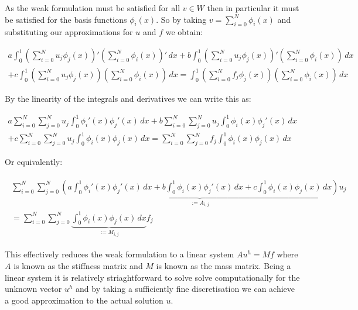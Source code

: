 As the weak formulation  must be satisfied for
all $v \in W$ then in particular it must be satisfied for the basis functions
$\phi_i(x)$. So by taking $v = \sum_{i = 0}^N\phi_i(x)$ and substituting our
approximations for $u$ and $f$ we obtain:

\begin{align*}
    a\int_0^1{\left(\sum_{i = 0}^N{u_j\phi_j(x)}\right)'\left(\sum_{i = 0}^N\phi_i(x)\right)'\, dx}
    +b\int_0^1{\left(\sum_{i = 0}^N{u_j\phi_j(x)}\right)'\left(\sum_{i = 0}^N\phi_i(x)\right)\, dx} \\
    +c\int_0^1{\left(\sum_{i = 0}^N{u_j\phi_j(x)}\right)\left(\sum_{i = 0}^N\phi_i(x)\right)\, dx} =
    \int_0^1{\left(\sum_{i = 0}^Nf_j\phi_j(x)\right)\left(\sum_{i = 0}^N\phi_i(x)\right)\, dx}
\end{align*}

By the linearity of the integrals and derivatives we can write this as:

\begin{align*}
    a\sum_{i = 0}^N\sum_{j = 0}^Nu_j\int_0^1\phi_i'(x)\phi_j'(x)\, dx
    +b\sum_{i = 0}^N\sum_{j = 0}^Nu_j\int_0^1\phi_i(x)\phi_j'(x)\, dx \\
    +c\sum_{i = 0}^N\sum_{j = 0}^Nu_j\int_0^1\phi_i(x)\phi_j(x)\, dx =
    \sum_{i = 0}^N\sum_{j = 0}^Nf_j\int_0^1\phi_i(x)\phi_j(x)\, dx
\end{align*}

Or equivalently:

\begin{align}\label{eq:oned-deterministic-discrete}
  \begin{split}
    \sum_{i = 0}^N\sum_{j = 0}^N\underbrace{\left(a\int_0^1\phi_i'(x)\phi_j'(x)\, dx
        + b\int_0^1\phi_i(x)\phi_j'(x)\, dx + c\int_0^1\phi_i(x)\phi_j(x)\, dx\right)}_{:= A_{i,j}}u_j  \\
    = \sum_{i= 0}^N\sum_{j = 0}^N\underbrace{\int_0^1{\phi_i(x)\phi_j(x)}\, dx}_{:= M_{i,j}}f_j
  \end{split}
\end{align}

This effectively reduces the weak formulation 
to a linear system $Au^h = Mf$ where $A$ is known as the stiffness matrix and
$M$ is known as the mass matrix. Being a linear system it is relatively
striaghtforward to solve solve computationally for the unknown vector $u^h$ and
by taking a sufficiently fine discretisation we can achieve a good
approximation to the actual solution $u$.

